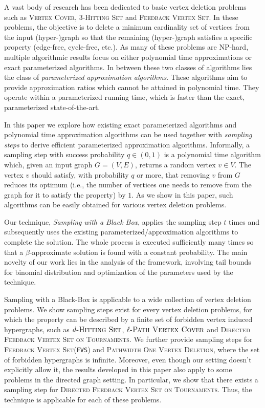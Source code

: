 \documentclass[letterpaper,11pt]{article}
\newcommand{\1}[1]{\mathds{1}\left[#1\right]}
\newcommand{\FVS}{\textnormal{\texttt{FVS}}\xspace}
\newcommand{\vc}{\textsc{Vertex Cover}\xspace}
\newcommand{\pathvc}[1]{\ensuremath{#1}\textsc{-Path Vertex Cover}\xspace}
\newcommand{\hs}[1]{\ensuremath{#1}\textsc{-Hitting Set}\xspace}
\newcommand{\fvs}{\textsc{Feedback Vertex Set}\xspace}
\newcommand{\dfvst}{\textsc{Directed Feedback Vertex Set on Tournaments}\xspace}
\newcommand{\povd}{\textsc{Pathwidth One Vertex Deletion}\xspace}
\begin{document}
A vast body of research has been dedicated to  basic vertex deletion problems such as \vc, \hs{3} and \fvs. In these problems, the objective is to delete a minimum cardinality set of vertices from the input (hyper-)graph so that the remaining (hyper-)graph  satisfies a specific property (edge-free, cycle-free, etc.). As many of these problems are NP-hard,  multiple algorithmic results  focus on either polynomial time approximations or exact parameterized algorithms.  In between these two classes of algorithms lies the class of {\em parameterized approximation algorithms}. These algorithms aim to provide approximation ratios which cannot be attained in polynomial time. They operate within a parameterized running time, which is faster than the exact, parameterized state-of-the-art. 


In this paper we explore how existing exact parameterized algorithms and polynomial time approximation algorithms can be used together with {\em sampling steps} to derive efficient parameterized approximation algorithms. Informally, a sampling  step with success probability $q\in (0,1)$ is a polynomial time algorithm which, given an input graph $G=(V,E)$, returns a random vertex $v\in V$. The vertex $v$ should satisfy, with probability $q$ or more, that removing $v$ from $G$ reduces its optimum (i.e., the number of vertices one needs to remove from the graph for it to satisfy the property) by $1$. As we show in this paper, such algorithms can be easily obtained for various vertex deletion problems.

Our technique, {\em Sampling with a Black Box}, applies the sampling step $t$ times and subsequently uses the existing parameterized/approximation algorithms to complete the solution. The whole process is executed sufficiently many times so that a $\beta$-approximate solution is found with a constant probability.  The main novelty of our work lies in the analysis of the framework, involving tail bounds for binomial distribution and optimization of the parameters used by the technique.


Sampling with a Black-Box is applicable to a wide collection of vertex deletion problems. We show sampling steps exist for every vertex deletion problems, for which the property can be described by a finite set of forbidden vertex induced  hypergraphs, such as $\hs{d}$, $\pathvc{\ell}$ and \dfvst. We further provide sampling steps for \fvs (\FVS) and  \povd, where the set of forbidden hypergraphs is infinite.
Moreover, even though our setting doesn't explicitly allow it, the results developed in this paper also apply to some problems in the directed graph setting. In particular, we show that there exists a sampling step for \dfvst. Thus, the technique is applicable for each of these problems.  
\end{document}

